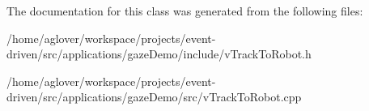 The documentation for this class was generated from the following files\+:\begin{DoxyCompactItemize}
\item 
/home/aglover/workspace/projects/event-\/driven/src/applications/gaze\+Demo/include/v\+Track\+To\+Robot.\+h\item 
/home/aglover/workspace/projects/event-\/driven/src/applications/gaze\+Demo/src/v\+Track\+To\+Robot.\+cpp\end{DoxyCompactItemize}
